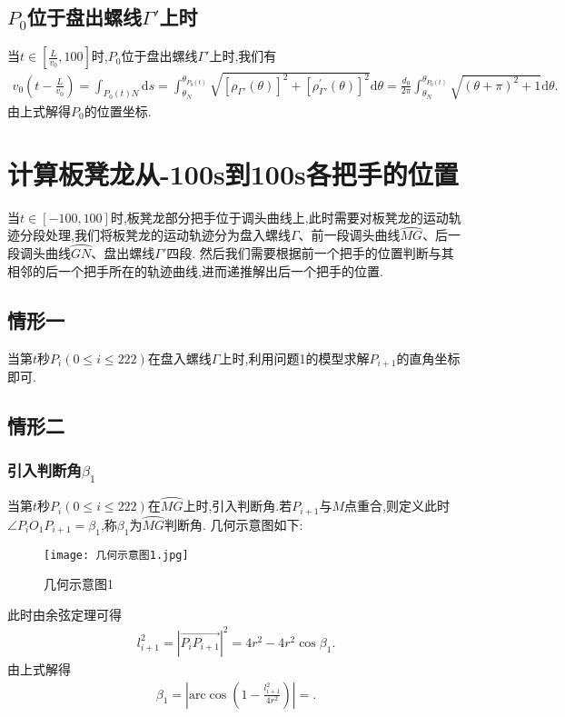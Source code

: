 \documentclass[lang=cn,newtx,10pt,scheme=chinese]{../Template/elegantbook}
\begin{document}
\subsection{$P_0$位于盘出螺线$\varGamma'$上时}

当$t\in[\frac{L}{v_0},100]$时,$P_0$位于盘出螺线$\varGamma'$上时,我们有
\begin{align}
v_0\left( t-\frac{L}{v_0} \right) =\int_{P_0\left( t \right) N}{\mathrm{d}s}=\int_{\theta _N}^{\theta _{P_0\left( t \right)}}{\sqrt{\left[ \rho _{\varGamma \prime}\left( \theta \right) \right] ^2+\left[ \rho _{\varGamma \prime}^{\prime}\left( \theta \right) \right] ^2}\mathrm{d}\theta}=\frac{d_0}{2\pi}\int_{\theta _N}^{\theta _{P_0\left( t \right)}}{\sqrt{\left( \theta +\pi \right) ^2+1}\mathrm{d}\theta }.
\end{align}
由上式解得$P_0$的位置坐标.

\section{计算板凳龙从-100s到100s各把手的位置}

当$t\in[-100,100]$时,板凳龙部分把手位于调头曲线上,此时需要对板凳龙的运动轨迹分段处理,我们将板凳龙的运动轨迹分为盘入螺线$\varGamma$、前一段调头曲线$\wideparen{MG}$、后一段调头曲线$\wideparen{GN}$、盘出螺线$\varGamma'$四段.
然后我们需要根据前一个把手的位置判断与其相邻的后一个把手所在的轨迹曲线,进而递推解出后一个把手的位置.

\subsection{情形一}

当第$t$秒$P_i(0\leq i\leq 222)$在盘入螺线$\varGamma$上时,利用问题1的模型求解$P_{i+1}$的直角坐标即可.

\subsection{情形二}

\subsubsection{引入判断角$\beta_1$}

当第$t$秒$P_i(0\leq i\leq 222)$在$\wideparen{MG}$上时,引入判断角.若$P_{i+1}$与$M$点重合,则定义此时$\angle P_iO_1P_{i+1}=\beta_1$,称$\beta_1$为$\wideparen{MG}$判断角. 几何示意图如下:
\begin{figure}[htbp]
\centering
\texttt{[image: 几何示意图1.jpg]}
\caption{几何示意图1}
\label{figure2}
\end{figure}
此时由余弦定理可得
\begin{align}
l_{i+1}^{2}=\left| \overrightarrow{P_iP_{i+1}} \right|^2=4r^2-4r^2\cos \beta _1.
\end{align}
由上式解得
\begin{align}
\beta _1=\left| \mathrm{arc}\cos \left( 1-\frac{l_{i+1}^{2}}{4r^2} \right) \right|=.
\end{align}
\end{document}

